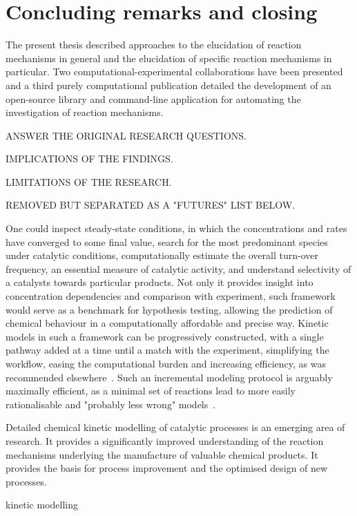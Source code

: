 \chapter{Concluding remarks and closing}%
\label{ch:conclusion}

The present thesis described approaches to the elucidation of reaction
mechanisms in general and the elucidation of specific reaction mechanisms in
particular.
Two computational-experimental collaborations have been presented and a third
purely computational publication detailed the development of an open-source
library and command-line application for automating the investigation of
reaction mechanisms.

ANSWER THE ORIGINAL RESEARCH QUESTIONS.\@

IMPLICATIONS OF THE FINDINGS.\@

LIMITATIONS OF THE RESEARCH.\@

REMOVED BUT SEPARATED AS A "FUTURES" LIST BELOW.

One could inspect steady-state conditions, in which the concentrations and rates have converged to some final value, search for the most predominant species under catalytic conditions, computationally estimate the overall turn-over frequency, an essential measure of catalytic activity, and understand selectivity of a catalysts towards particular products.
Not only it provides insight into concentration dependencies and comparison with experiment, such framework would serve as a benchmark for hypothesis testing, allowing the prediction of chemical behaviour in a computationally affordable and precise way.
Kinetic models in such a framework can be progressively constructed, with a single pathway added at a time until a match with the experiment, simplifying the workflow, easing the computational burden and increasing efficiency, as was recommended elsewhere~\cite{Jara_z_2019}.
Such an incremental modeling protocol is arguably maximally efficient, as a minimal set of reactions lead to more easily rationalisable and "probably less wrong" models~\cite{Blackmond_2015,Jara_z_2019}.

Detailed chemical kinetic modelling of catalytic processes is an emerging area of research. It provides a significantly improved understanding of the reaction mechanisms underlying the manufacture of valuable chemical products. It provides the basis for process improvement and the optimised design of new processes.

kinetic modelling

